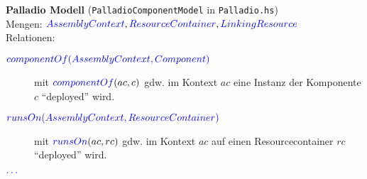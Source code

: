 \documentclass[varwidth=20cm]{standalone}
\begin{document}
\textbf{Palladio Modell} (\texttt{PalladioComponentModel} in \texttt{Palladio.hs})\\

Mengen: ${\color{blue}{AssemblyContext}}, {\color{blue}{ResourceContainer}}, {\color{blue}{LinkingResource}}$ \\

Relationen:
\begin{description}
  \item[${\color{blue}{componentOf(AssemblyContext, Component)}}$]
        mit ${\color{blue}{componentOf}}(ac, c)$ gdw. im Kontext $ac$ eine Instanz der Komponente
        $c$ \enquote{deployed} wird.
  \item[${\color{blue}{runsOn(AssemblyContext, ResourceContainer)}}$]
        mit ${\color{blue}{runsOn}}(ac, rc)$ gdw. im Kontext $ac$ auf einen Resourcecontainer $rc$
        \enquote{deployed} wird.
  \item[${\color{blue}{\ldots}}$]
\end{description}
\end{document}
